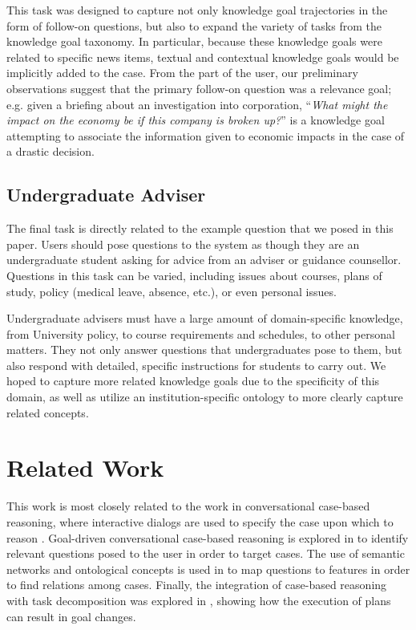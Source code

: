 \documentclass[11pt,letterpaper]{article}
\begin{document}
This task was designed to capture not only knowledge goal trajectories in the form of follow-on questions, but also to expand the variety of tasks from the knowledge goal taxonomy. In particular, because these knowledge goals were related to specific news items, textual and contextual knowledge goals would be implicitly added to the case. From the part of the user, our preliminary observations suggest that the primary follow-on question was a relevance goal; e.g. given a briefing about an investigation into corporation, ``\textit{What might the impact on the economy be if this company is broken up?}'' is a knowledge goal attempting to associate the information given to economic impacts in the case of a drastic decision.

\subsection{Undergraduate Adviser}

The final task is directly related to the example question that we posed in this paper. Users should pose questions to the system as though they are an undergraduate student asking for advice from an adviser or guidance counsellor. Questions in this task can be varied, including issues about courses, plans of study, policy (medical leave, absence, etc.), or even personal issues.

Undergraduate advisers must have a large amount of domain-specific knowledge, from University policy, to course requirements and schedules, to other personal matters. They not only answer questions that undergraduates pose to them, but also respond with detailed, specific instructions for students to carry out. We hoped to capture more related knowledge goals due to the specificity of this domain, as well as utilize an institution-specific ontology to more clearly capture related concepts.

\section{Related Work}

This work is most closely related to the work in conversational case-based reasoning, where interactive dialogs are used to specify the case upon which to reason \cite{aha_advances_2005}. Goal-driven conversational case-based reasoning is explored in \cite{mcsherry_conversational_2005} to identify relevant questions posed to the user in order to target cases. The use of semantic networks and ontological concepts is used in \cite{gu_knowledge-intensive_2005} to map questions to features in order to find relations among cases. Finally, the integration of case-based reasoning with task decomposition was explored in \cite{munoz-avila_sin:_2001}, showing how the execution of plans can result in goal changes.
\end{document}
